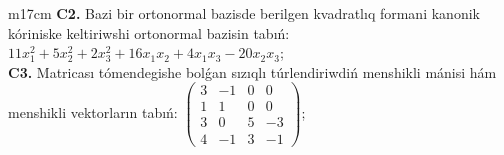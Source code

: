 \documentclass{article}
\begin{document}
\begin{tabular}{m{17cm}}
\textbf{C2.} Bazi bir ortonormal bazisde berilgen kvadratlıq formani kanonik kóriniske keltiriwshi ortonormal bazisin tabıń: \(11x_{1}^{2} + 5x_{2}^{2} + 2x_{3}^{2} + 16x_{1}x_{2} + 4x_{1}x_{3} - 20x_{2}x_{3}\); \\
\textbf{C3.} Matricası tómendegishe bolǵan sızıqlı túrlendiriwdiń menshikli mánisi hám menshikli vektorların tabıń: \(\begin{pmatrix} 3 & - 1 & 0 & 0 \\ 1 & 1 & 0 & 0 \\ 3 & 0 & 5 & - 3 \\ 4 & - 1 & 3 & - 1 \end{pmatrix}\); \\

\end{tabular}
\vspace{1cm}
\end{document}

